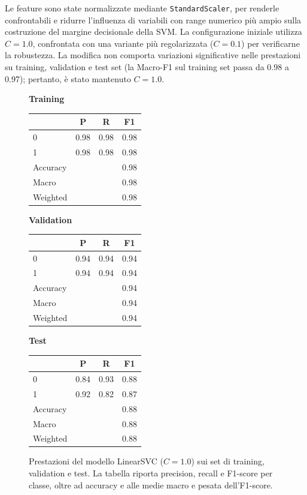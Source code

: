 \documentclass{article}
\begin{document}
Le feature sono state normalizzate mediante \texttt{StandardScaler}, per renderle confrontabili e ridurre l’influenza di variabili con range numerico più ampio sulla costruzione del margine decisionale della SVM.
La configurazione iniziale utilizza $C=1.0$, confrontata con una variante più regolarizzata ($C=0.1$) per verificarne la robustezza. La modifica non comporta variazioni significative nelle prestazioni su training, validation e test set (la Macro-F1 sul training set passa da 0.98 a 0.97); pertanto, è stato mantenuto $C=1.0$.

\begin{figure}[h]
\centering
\begin{minipage}[b]{0.32\textwidth}
\centering
\textbf{Training}\\[2mm]
\begin{tabular}{l c c c}
\hline
 & \textbf{P} & \textbf{R} & \textbf{F1} \\
\hline
0 & 0.98 & 0.98 & 0.98 \\
1 & 0.98 & 0.98 & 0.98 \\
\hline
Accuracy & & & 0.98 \\
Macro & & & 0.98 \\
Weighted & & & 0.98 \\
\hline
\end{tabular}
\end{minipage}
\hfill
\begin{minipage}[b]{0.32\textwidth}
\centering
\textbf{Validation}\\[2mm]
\begin{tabular}{l c c c}
\hline
 & \textbf{P} & \textbf{R} & \textbf{F1} \\
\hline
0 & 0.94 & 0.94 & 0.94 \\
1 & 0.94 & 0.94 & 0.94 \\
\hline
Accuracy & & & 0.94 \\
Macro & & & 0.94 \\
Weighted & & & 0.94 \\
\hline
\end{tabular}
\end{minipage}
\hfill
\begin{minipage}[b]{0.32\textwidth}
\centering
\textbf{Test}\\[2mm]
\begin{tabular}{l c c c}
\hline
 & \textbf{P} & \textbf{R} & \textbf{F1} \\
\hline
0 & 0.84 & 0.93 & 0.88 \\
1 & 0.92 & 0.82 & 0.87 \\
\hline
Accuracy & & & 0.88 \\
Macro & & & 0.88 \\
Weighted & & & 0.88 \\
\hline
\end{tabular}
\end{minipage}
\caption{Prestazioni del modello LinearSVC ($C=1.0$) sui set di training, validation e test. La tabella riporta precision, recall e F1-score per classe, oltre ad accuracy e alle medie macro e pesata dell'F1-score.}
\label{tab:svc_reports}
\end{figure}
\end{document}
